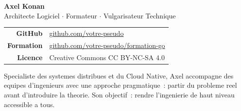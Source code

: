 \documentclass[11pt,a4paper,openany]{book}
\begin{document}
\begin{center}

\vspace{5mm}
{\Large\bfseries\color{GoDark}Axel Konan}\\[2mm]
{\color{GoGrey}Architecte Logiciel
  $\cdot$ Formateur
  $\cdot$ Vulgarisateur Technique}\\[6mm]

\begin{tabular}{rl}
  \textbf{GitHub}    &
    \href{https://github.com/votre-pseudo}{github.com/votre-pseudo} \\
  \textbf{Formation} &
    \href{https://github.com/votre-pseudo/formation-go}%
         {github.com/votre-pseudo/formation-go} \\
  \textbf{Licence}   & Creative Commons CC BY-NC-SA 4.0 \\
\end{tabular}

\vspace{6mm}
\begin{minipage}{0.82\textwidth}
\centering\small\color{GoGrey}
Specialiste des systemes distribues et du Cloud Native,
Axel accompagne des equipes d'ingenieurs avec une approche
pragmatique~: partir du probleme reel avant d'introduire la theorie.
Son objectif~: rendre l'ingenierie de haut niveau accessible a tous.
\end{minipage}
\end{center}
\end{document}
